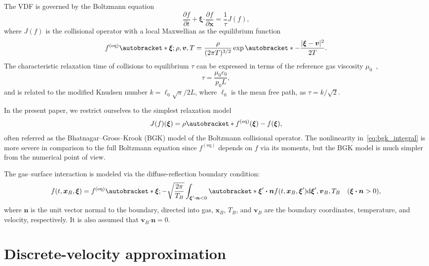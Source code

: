 \documentclass{elsarticle} %
\newcommand{\dd}{\mathrm{d}}
\newcommand{\pder}[2][]{\frac{\partial#1}{\partial#2}}
\DeclarePairedDelimiter\autobracket()       %
\newcommand{\br}[1]{\autobracket*{#1}}
\newcommand{\dxi}{\dd{\boldsymbol{\xi}}}
\newcommand{\bxi}{\boldsymbol{\xi}}
\newcommand{\bv}{\boldsymbol{v}}
\newcommand{\bn}{\boldsymbol{n}}
\newcommand{\bdot}{\boldsymbol{\cdot}}
\newcommand{\bx}{\boldsymbol{x}}
\newcommand{\equil}[1]{#1^\mathrm{(eq)}}
\newcommand{\refer}[1]{#1_0}
\begin{document}
The VDF is governed by the Boltzmann equation
\begin{equation}\label{eq:Boltzmann}
    \pder[f]{t} + \bxi\bdot\pder[f]{\bx} = \frac1\tau J(f),
\end{equation}
where \(J(f)\) is the collisional operator with a local Maxwellian as the equilibrium function
\begin{equation}\label{eq:equilibrium}
    \equil{f}\br{\bxi; \rho, \bv, T} = \frac{\rho}{(2\pi T)^{3/2}}\exp\br{-\frac{|\bxi-\bv|^2}{2T}}.
\end{equation}
The characteristic relaxation time of collisions to equilibrium \(\tau\)
can be expressed in terms of the reference gas viscosity \(\refer\mu\)~\cite{Cercignani2000, Sone2007},
\begin{equation}\label{eq:tau}
    \tau = \frac{\refer\mu\refer{c}}{\refer{p}L},
\end{equation}
and is related to the modified Knudsen number \(k=\ell_0\sqrt\pi/2L\), where \(\ell_0\) is the mean free path,
as \(\tau = k / \sqrt2\).

In the present paper, we restrict ourselves to the simplest relaxation model~\cite{Krook1954, Welander1954}
\begin{equation}\label{eq:bgk_integral}
    J(f)(\bxi) = \rho\br{\equil{f}(\bxi) - f(\bxi)},
\end{equation}
often referred as the Bhatnagar--Gross--Krook (BGK) model of the Boltzmann collisional operator.
The nonlinearity in~\eqref{eq:bgk_integral} is more severe in comparison to the full Boltzmann equation
since \(\equil{f}\) depends on \(f\) via its moments,
but the BGK model is much simpler from the numerical point of view.

The gas--surface interaction is modeled via the diffuse-reflection boundary condition:
\begin{equation}\label{eq:diffuse}
    f(t,\bx_B,\bxi) = \equil{f} \br{ \bxi;
        -\sqrt\frac{2\pi}{T_B} \int_{\bxi'\bdot\bn<0} \br{ \bxi'\bdot\bn } f(t,\bx_B,\bxi')\dxi', \bv_B, T_B
    } \quad (\bxi\bdot\bn>0),
\end{equation}
where \(\bn\) is the unit vector normal to the boundary, directed into gas,
\(\bx_B\), \(T_B\), and \(\bv_B\) are the boundary coordinates, temperature, and velocity, respectively.
It is also assumed that \(\bv_B\bdot\bn = 0\).

\section{Discrete-velocity approximation}\label{sec:dv}
\end{document}
